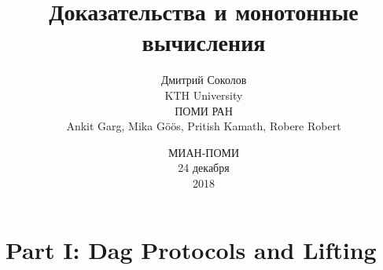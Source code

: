 \documentclass[english, xcolor = {table}]{beamer}
\title[Доказательства и вычисления]{
    Доказательства и монотонные вычисления
}
\author[Соколов Д.]{
    Дмитрий Соколов\\
    KTH University\\
    ПОМИ РАН\\
    \vspace{1cm}
    Ankit Garg, Mika G{\"{o}}{\"{o}}s,  Pritish Kamath, Robere Robert
}
\date{МИАН-ПОМИ\\
	24 декабря\\
	2018
}
\begin{document}
    \maketitle

    \section{Part I: Dag Protocols and Lifting}

    


\end{document}
